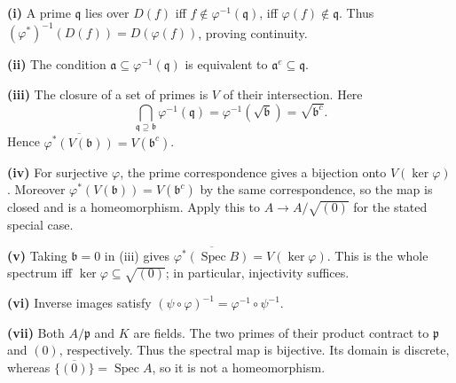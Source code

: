 \textbf{(i)} A prime $\mathfrak q$ lies over $D(f)$ iff $f\notin\varphi^{-1}(\mathfrak q)$, iff $\varphi(f)\notin\mathfrak q$. Thus $(\varphi^*)^{-1}(D(f))=D(\varphi(f))$, proving continuity.

\textbf{(ii)} The condition $\mathfrak a\subseteq\varphi^{-1}(\mathfrak q)$ is equivalent to $\mathfrak a^e\subseteq\mathfrak q$.

\textbf{(iii)} The closure of a set of primes is $V$ of their intersection. Here
\[\bigcap_{\mathfrak q\supseteq\mathfrak b}\varphi^{-1}(\mathfrak q)=\varphi^{-1}(\sqrt{\mathfrak b})=\sqrt{\mathfrak b^c}.\]
Hence $\overline{\varphi^*(V(\mathfrak b))}=V(\mathfrak b^c)$.

\textbf{(iv)} For surjective $\varphi$, the prime correspondence gives a bijection onto $V(\ker\varphi)$. Moreover $\varphi^*(V(\mathfrak b))=V(\mathfrak b^c)$ by the same correspondence, so the map is closed and is a homeomorphism. Apply this to $A\to A/\sqrt{(0)}$ for the stated special case.

\textbf{(v)} Taking $\mathfrak b=0$ in (iii) gives $\overline{\varphi^*(\operatorname{Spec}B)}=V(\ker\varphi)$. This is the whole spectrum iff $\ker\varphi\subseteq\sqrt{(0)}$; in particular, injectivity suffices.

\textbf{(vi)} Inverse images satisfy $(\psi\circ\varphi)^{-1}=\varphi^{-1}\circ\psi^{-1}$.

\textbf{(vii)} Both $A/\mathfrak p$ and $K$ are fields. The two primes of their product contract to $\mathfrak p$ and $(0)$, respectively. Thus the spectral map is bijective. Its domain is discrete, whereas $\overline{\{(0)\}}=\operatorname{Spec}A$, so it is not a homeomorphism.

